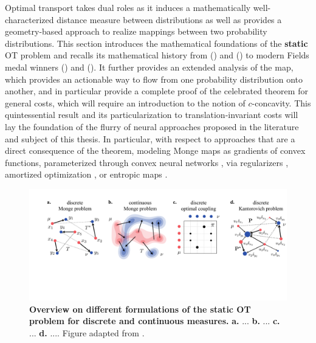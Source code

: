 Optimal transport takes dual roles as it induces a mathematically well-characterized distance measure between distributions as well as provides a geometry-based approach to realize mappings between two probability distributions.
This section introduces the mathematical foundations of the \textbf{static} OT problem and recalls its mathematical history from \citeauthor{monge1781histoire} (\citeyear{monge1781histoire}) and \citeauthor{kantorovich1942transfer} (\citeyear{kantorovich1942transfer}) to modern Fields medal winners \citeauthor{villani2009optimal} (\citeyear{villani2009optimal}) and \citeauthor{figalli2010optimal} (\citeyear{figalli2010optimal}). 
It further provides an extended analysis of the \citeauthor{monge1781histoire} map, which provides an actionable way to flow from one probability distribution onto another, and in particular provide a complete proof of the celebrated \citeauthor{brenier1987decomposition} theorem for general costs, which will require an introduction to the notion of $c$-concavity. This quintessential result and its particularization to translation-invariant costs will lay the foundation of the flurry of neural approaches proposed in the literature and subject of this thesis. 
In particular, with respect to approaches that are a direct consequence of the \citeauthor{brenier1987decomposition} theorem, modeling Monge maps as gradients of convex functions, parameterized through convex neural networks \citep{amos2017input, huang2021convex, makkuva2020optimal, korotin2021neural, lubeck2022neural, bunne2022supervised}, via regularizers \citep{uscidda2023monge}, amortized optimization \citep{amos2022amortizing, amos2022meta}, or entropic maps \citep{pooladian2021entropic, pooladian2023minimax, divol2022optimal, cuturi2023monge}.

\begin{figure}[t]
  \includegraphics[width=\textwidth]{figures/fig_ot_background.pdf}
  \caption{\textbf{Overview on different formulations of the static OT problem for discrete and continuous measures.} \textbf{a.} ... \textbf{b.} ... \textbf{c.} ... \textbf{d.} .... Figure adapted from \citet{peyre2019computational}.}	
  \label{fig:ot_principles}
\end{figure}

